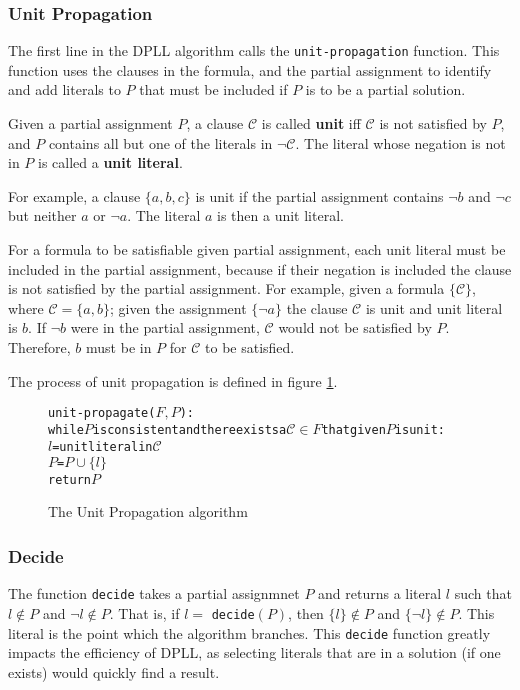 \subsubsection{Unit Propagation}
\label{impl.unit}
The first line in the  DPLL algorithm calls the \texttt{unit-propagation} function.
This function uses the clauses in the formula, and the partial assignment to identify and add literals to $P$ that must be included if $P$ is to be a partial solution.

\begin{defs}
Given a partial assignment $P$, a clause $\mathcal{C}$ is called \textbf{unit} iff $\mathcal{C}$ is not satisfied by $P$, and $P$ contains all but one of the literals in $\neg \mathcal{C}$.
The literal whose negation is not in $P$ is called a \textbf{unit literal}. 
\end{defs}

For example, a clause $\{a,b,c\}$ is unit if the partial assignment contains $\neg b$ and $\neg c$ but neither $a$ or $\neg a$.
The literal $a$ is then a unit literal.

For a formula to be satisfiable given partial assignment, each unit literal must be included in the partial assignment,
because if their negation is included the clause is not satisfied by the partial assignment.
For example, given a formula $\{\mathcal{C}\}$, where $\mathcal{C} = \{a,b\}$;
given the assignment $\{\neg a\}$ the clause $\mathcal{C}$ is unit and unit literal is $b$.
If $\neg b$ were in the partial assignment, $\mathcal{C}$ would not be satisfied by $P$.
Therefore, $b$ must be in $P$ for $\mathcal{C}$ to be satisfied.

The process of unit propagation is defined in figure \ref{impl.propagation}.
\begin{figure}[htp]
\begin{center}
\begin{alltt}
unit-propagate(\(F, P\)):
  while \(P\) is consistent and there exists a \(\mathcal{C} \in F\) that given \(P\) is unit:
    \(l\) = unit literal in \(\mathcal{C}\)
    \(P\) = \(P \cup \{l\}\)
  return \(P\)
\end{alltt}
  \caption{The Unit Propagation algorithm}
  \label{impl.propagation}
\end{center}
\end{figure}

\subsubsection{Decide}
\label{impl.litorder}
The function \verb+decide+ takes a partial assignmnet $P$ and returns a literal $l$ such that $l \not \in P$ and $\neg l \not \in P$.
That is, if $l =$ \verb+decide+$(P)$, then $\{l\} \not \in P$ and $\{\neg l\} \not \in P$.
This literal is the point which the algorithm branches.
This \verb+decide+ function greatly impacts the efficiency of DPLL, as selecting literals that are in a solution (if one exists) would quickly find a result.

